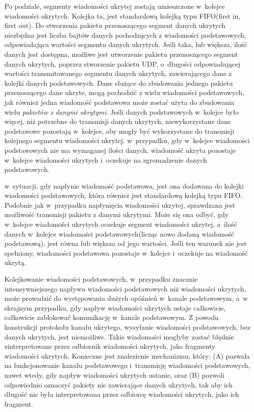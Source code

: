 \documentclass[a4paper, twoside, 12pt]{report}
\begin{document}
    Po podziale, segmenty wiadomości ukrytej zostają umieszczone w~kolejce wiadomości
    ukrytych. Kolejka ta, jest standardową kolejką typu FIFO(first in, first out).
    Do stworzenia pakietu przenoszącego segment danych ukrytych niezbędna jest
    liczba bajtów danych pochodzących z wiadomości podstawowych, odpowiadająca
    wartości segmentu danych ukrytych. Jeśli taka, lub większa, ilość danych jest dostępna,
    możliwe jest utworzenie pakietu przenoszącego segment danych ukrytych, poprzez
    stworzenie pakietu UDP, o~długości odpowiadającej wartości transmitowanego segmentu danych
    ukrytych, zawierającego dane z kolejki danych podstawowych. Dane służące do zbudowania
    jednego pakietu przenoszącego dane ukryte, mogą pochodzić z wielu wiadomości
    podstawowych, jak również jedna wiadomość podstawowa może zostać użyta do zbudowania
    wielu \emph{pakietów z danymi ukrytymi}. Jeśli danych podstawowych
    w~kolejce było więcej, niż potrzebne do transmisji danych ukrytych, niewykorzystane
    dane podstawowe pozostają w~kolejce, aby mogły być wykorzystane do transmisji
    kolejnego segmentu wiadomości ukrytej.
    w~przypadku, gdy w~kolejce wiadomości podstawowych nie ma wymaganej ilości
    danych, wiadomość ukryta pozostaje w~kolejce wiadomości ukrytych i~oczekuje
    na zgromadzenie danych podstawowych.

    w~sytuacji, gdy napłynie wiadomość podstawowa, jest ona dodawana do kolejki
    wiadomości podstawowych, która również jest standardową kolejką typu FIFO.
    Podobnie jak w~przypadku napłynięcia wiadomości ukrytej, sprawdzana jest możliwość
    transmisji pakietu z danymi ukrytymi. Może się ona odbyć, gdy w~kolejce wiadomości
    ukrytych oczekuje segment wiadomości ukrytej, a~ilość danych w~kolejce wiadomości
    podstawowych(licząc nowo dodaną wiadomość podstawową), jest równa lub większa
    od jego wartości. Jeśli ten warunek nie jest spełniony, wiadomości podstawowa
    pozostaje w~kolejce i~oczekuje na wiadomość ukrytą.

    Kolejkowanie wiadomości podstawowych, w~przypadku znacznie intensywniejszego
    napływu wiadomości podstawowych niż wiadomości ukrytych, może prowadzić do
    występowania dużych opóźnień w~kanale podstawowym, a~w skrajnym przypadku,
    gdy napływ wiadomości ukrytych ustaje całkowicie, całkowicie zablokować
    komunikację w~kanale podstawowym. Z powodu konstrukcji protokołu kanału
    ukrytego, wysyłanie wiadomości podstawowych, bez danych ukrytych, jest niemożliwe.
    Takie wiadomości mogłyby zostać błędnie zinterpretowane przez odbiornik wiadomości
    ukrytych, jako fragmenty wiadomości ukrytych. Konieczne jest znalezienie mechanizmu,
    który: (A) pozwala na funkcjonowanie kanału podstawowego i~transmisję wiadomości
    podstawowych, nawet wtedy, gdy napływ wiadomości ukrytych ustanie, oraz (B)
    pozwoli odpowiednio oznaczyć pakiety nie zawierające danych ukrytych, tak aby ich długość
    nie była interpretowana przez odbiorcę wiadomości ukrytych, jako ich fragment.
\end{document}
